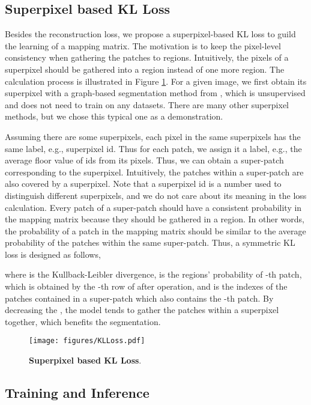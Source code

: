 \documentclass{article}
\theoremstyle{plain}
\theoremstyle{definition}
\theoremstyle{remark}
\begin{document}
\subsection{Superpixel based KL Loss}
Besides the reconstruction loss, we propose a superpixel-based KL loss to guild the learning of a mapping matrix. The motivation is to keep the pixel-level consistency when gathering the patches to regions. Intuitively, the pixels of a superpixel should be gathered into a region instead of one more region. The calculation process is illustrated in Figure \ref{fig:klloss}. For a given image, we first obtain its superpixel with a graph-based segmentation method from \cite{felzenszwalb2004efficient}, which is unsupervised and does not need to train on any datasets. There are many other superpixel methods, but we chose this typical one as a demonstration. 

Assuming there are some superpixels, each pixel in the same superpixels has the same label, e.g., superpixel id. Thus for each patch, we assign it a label, e.g., the average floor value of ids from its pixels. Thus, we can obtain a super-patch corresponding to the superpixel. Intuitively, the patches within a super-patch are also covered by a superpixel. Note that a superpixel id is a number used to distinguish different superpixels, and we do not care about its meaning in the loss calculation. Every patch of a super-patch should have a consistent probability in the mapping matrix  because they should be gathered in a region. In other words, the probability of a patch in the mapping matrix should be similar to the average probability of the patches within the same super-patch. Thus, a symmetric KL loss is designed as follows,

where  is the Kullback-Leibler divergence,  is the regions' probability of -th patch, which is obtained by the -th row of  after  operation, and  is the indexes of the patches contained in a super-patch which also contains the -th patch. By decreasing the , the model tends to gather the patches within a superpixel together, which benefits the segmentation.
\begin{figure}[tp]
    \centering
    \texttt{[image: figures/KLLoss.pdf]}
    \caption{\textbf{Superpixel based KL Loss}.}
    \label{fig:klloss}
\end{figure}

\subsection{Training and Inference}
\end{document}
